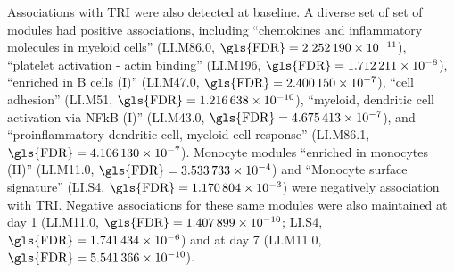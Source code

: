 Associations with \gls{TRI} were also detected at baseline.
A diverse set of set of modules had positive associations, including
\enquote{chemokines and inflammatory molecules in myeloid cells} (LI.M86.0,  $\text{\gls{FDR}} = \num{2.252190e-11}$),
\enquote{platelet activation - actin binding} (LI.M196, $\text{\gls{FDR}} = \num{1.712211e-08}$),
\enquote{enriched in B cells (I)} (LI.M47.0, $\text{\gls{FDR}} = \num{2.400150e-07}$),
\enquote{cell adhesion} (LI.M51, $\text{\gls{FDR}} = \num{1.216638e-10}$),
\enquote{myeloid, dendritic cell activation via NFkB (I)} (LI.M43.0, $\text{\gls{FDR}} = \num{4.675413e-07}$),
and \enquote{proinflammatory dendritic cell, myeloid cell response} (LI.M86.1, $\text{\gls{FDR}} = \num{4.106130e-07}$).
Monocyte modules 
\enquote{enriched in monocytes (II)} (LI.M11.0, $\text{\gls{FDR}} = \num{3.533733e-04}$) and
\enquote{Monocyte surface signature} (LI.S4, $\text{\gls{FDR}} = \num{1.170804e-03}$)
were negatively association with \gls{TRI}.
Negative associations for these same modules were also maintained at day 1 (LI.M11.0, $\text{\gls{FDR}} = \num{1.407899e-10}$;
LI.S4, $\text{\gls{FDR}} = \num{1.741434e-06}$)
and at day 7 (LI.M11.0, $\text{\gls{FDR}} = \num{5.541366e-10}$).


